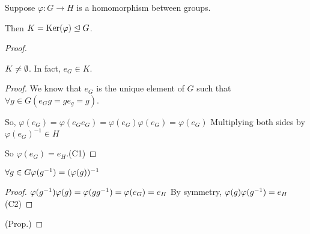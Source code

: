 \documentclass[notes.tex]{subfiles}
\begin{document}
\begin{proposition}
	Suppose $\varphi:G\to H$ is a homomorphism between groups.

	Then $K=\operatorname{\mathrm{Ker}}(\varphi) \trianglelefteq G$.
\end{proposition}
\begin{proof}
	\begin{claim}[1]
		$K \ne \emptyset$. In fact, $e_G\in K$.
	\end{claim}
	\begin{proof}
		We know that $e_G$ is the unique element of $G$ such that $\forall g\in G(e_Gg=ge_g = g)$.

		So, $\varphi(e_G) = \varphi(e_Ge_G) = \varphi(e_G)\varphi(e_G) = \varphi(e_G)$
		Multiplying both sides by $\varphi(e_G)^{-1}\in H$

		So $\varphi(e_G) = e_H$.\qedhere(C1)
	\end{proof}

	\begin{claim}[2]
		$\forall g\in G \varphi({g}^{-1}) = (\varphi(g))^{-1}$
	\end{claim}
	\begin{proof}
		$\varphi({g}^{-1})\varphi(g) = \varphi(g{g}^{-1}) = \varphi(e_G) = e_H$
		By symmetry, $\varphi(g)\varphi({g}^{-1}) = e_H$\qedhere(C2)
	\end{proof}
	\qedhere(Prop.)
\end{proof}
\end{document}
